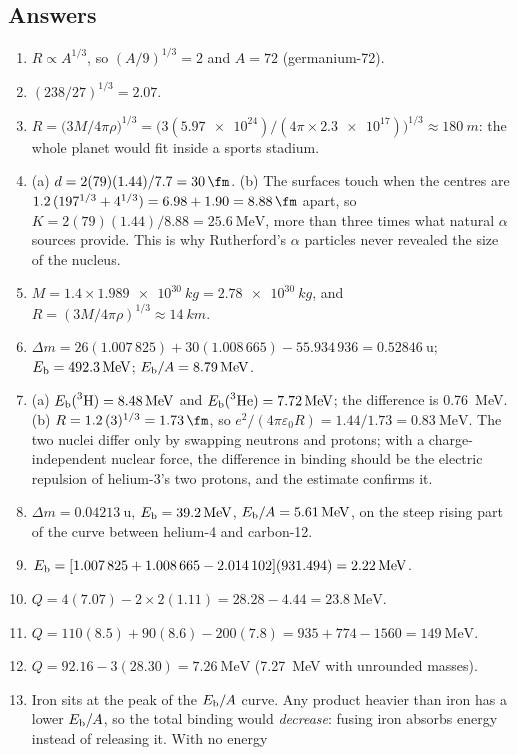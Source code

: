 \subsection*{Answers}
{\small
\begin{enumerate}[itemsep=2pt]
\item $R\propto A^{1/3}$, so $(A/9)^{1/3}=2$ and $A=72$ (germanium-72).
\item $(238/27)^{1/3}=2.07$.
\item $R=\big(3M/4\pi\rho\big)^{1/3}=\big(3(\num{5.97e24})/(4\pi\times\num{2.3e17})\big)^{1/3}\approx
\SI{180}{m}$: the whole planet would fit inside a sports stadium.
\item (a) $d=2(79)(1.44)/7.7=\SI{30}{\fm}$. (b) The surfaces touch when the centres are
$1.2\,(197^{1/3}+4^{1/3})=6.98+1.90=\SI{8.88}{\fm}$ apart, so $K=2(79)(1.44)/8.88=\SI{25.6}{\MeV}$,
more than three times what natural $\alpha$ sources provide. This is why Rutherford's $\alpha$ particles
never revealed the size of the nucleus.
\item $M=1.4\times\SI{1.989e30}{kg}=\SI{2.78e30}{kg}$, and $R=(3M/4\pi\rho)^{1/3}\approx\SI{14}{km}$.
\item $\Delta m=26(1.007\,825)+30(1.008\,665)-55.934\,936=\SI{0.52846}{\amu}$; $\Eb=\SI{492.3}{\MeV}$;
$\Eb/A=\SI{8.79}{\MeV}$.
\item (a) $\Eb(\iso{3}{H})=\SI{8.48}{\MeV}$ and $\Eb(\iso{3}{He})=\SI{7.72}{\MeV}$; the difference is
\SI{0.76}{\MeV}. (b) $R=1.2\,(3)^{1/3}=\SI{1.73}{\fm}$, so $e^2/(4\pi\varepsilon_0R)=1.44/1.73=
\SI{0.83}{\MeV}$. The two nuclei differ only by swapping neutrons and protons; with a charge-independent
nuclear force, the difference in binding should be the electric repulsion of helium-3's two protons, and
the estimate confirms it.
\item $\Delta m=\SI{0.04213}{\amu}$, $\Eb=\SI{39.2}{\MeV}$, $\Eb/A=\SI{5.61}{\MeV}$, on the steep
rising part of the curve between helium-4 and carbon-12.
\item $\Eb=[1.007\,825+1.008\,665-2.014\,102](931.494)=\SI{2.22}{\MeV}$.
\item $Q=4(7.07)-2\times2(1.11)=28.28-4.44=\SI{23.8}{\MeV}$.
\item $Q=110(8.5)+90(8.6)-200(7.8)=935+774-1560=\SI{149}{\MeV}$.
\item $Q=92.16-3(28.30)=\SI{7.26}{\MeV}$ (\SI{7.27}{\MeV} with unrounded masses).
\item Iron sits at the peak of the $E_{\mathrm{b}}/A$ curve. Any product heavier than iron has a lower $E_{\mathrm{b}}/A$, so the
total binding would \emph{decrease}: fusing iron absorbs energy instead of releasing it. With no energy

\end{enumerate}}
